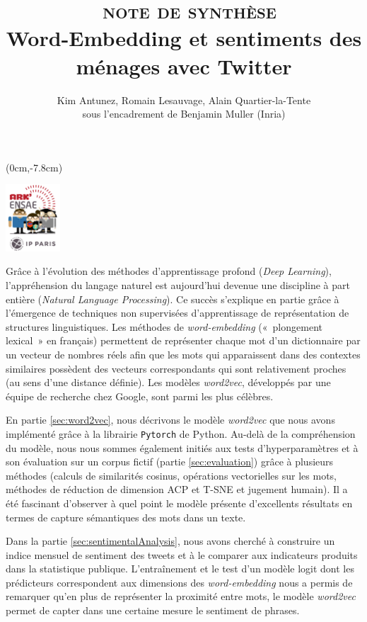 \documentclass[10pt,french,french]{article}
\title{~\textsc{note de synthèse}\\
\hspace*{0.333em}Word-Embedding et sentiments des ménages avec Twitter}
\author{Kim Antunez, Romain Lesauvage, Alain Quartier-la-Tente\\
sous l'encadrement de Benjamin Muller (Inria)}
\date{}
\begin{document}
\maketitle


\begin{textblock*}{\textwidth}(0cm,-7.8cm)
\begin{center}
\includegraphics[height=2.5cm]{img/LOGO-ENSAE.png}
\end{center}
\end{textblock*}

Grâce à l'évolution des méthodes d'apprentissage profond (\emph{Deep
Learning}), l'appréhension du langage naturel est aujourd'hui devenue
une discipline à part entière (\emph{Natural Language Processing}). Ce
succès s'explique en partie grâce à l'émergence de techniques non
supervisées d'apprentissage de représentation de structures
linguistiques. Les méthodes de \emph{word-embedding} («~plongement
lexical~» en français) permettent de représenter chaque mot d'un
dictionnaire par un vecteur de nombres réels afin que les mots qui
apparaissent dans des contextes similaires possèdent des vecteurs
correspondants qui sont relativement proches (au sens d'une distance
définie). Les modèles \emph{word2vec}, développés par une équipe de
recherche chez Google, sont parmi les plus célèbres.

En partie \ref{sec:word2vec}, nous décrivons le modèle \emph{word2vec}
que nous avons implémenté grâce à la librairie \texttt{Pytorch} de
Python. Au-delà de la compréhension du modèle, nous nous sommes
également initiés aux tests d'hyperparamètres et à son évaluation sur un
corpus fictif (partie \ref{sec:evaluation}) grâce à plusieurs méthodes
(calculs de similarités cosinus, opérations vectorielles sur les mots,
méthodes de réduction de dimension ACP et T-SNE et jugement humain). Il
a été fascinant d'observer à quel point le modèle présente d'excellents
résultats en termes de capture sémantiques des mots dans un texte.

Dans la partie \ref{sec:sentimentalAnalysis}, nous avons cherché à
construire un indice mensuel de sentiment des tweets et à le comparer
aux indicateurs produits dans la statistique publique. L'entraînement et
le test d'un modèle logit dont les prédicteurs correspondent aux
dimensions des \emph{word-embedding} nous a permis de remarquer qu'en
plus de représenter la proximité entre mots, le modèle \emph{word2vec}
permet de capter dans une certaine mesure le sentiment de phrases.
\end{document}
